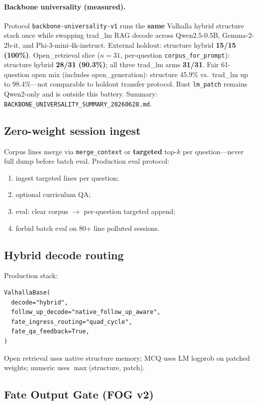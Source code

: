\documentclass[11pt,a4paper]{article}
\begin{document}
\paragraph{Backbone universality (measured).}
Protocol \texttt{backbone-universality-v1} runs the \textbf{same} Valhalla hybrid structure stack once while swapping trad\_lm RAG decode across Qwen2.5-0.5B, Gemma-2-2b-it, and Phi-3-mini-4k-instruct. External holdout: structure hybrid \textbf{15/15 (100\%)}. Open\_retrieval slice ($n=31$, per-question \texttt{corpus\_for\_prompt}): structure hybrid \textbf{28/31 (90.3\%)}; all three trad\_lm arms \textbf{31/31}. Fair 61-question open mix (includes open\_generation): structure 45.9\% vs.\ trad\_lm up to 98.4\%---not comparable to holdout transfer protocol. Rust \texttt{lm\_patch} remains Qwen2-only and is outside this battery. Summary: \texttt{BACKBONE\_UNIVERSALITY\_SUMMARY\_20260628.md}.

\subsection{Zero-weight session ingest}

Corpus lines merge via \texttt{merge\_context} or \textbf{targeted} top-$k$ per question---never full dump before batch eval. Production eval protocol:
\begin{enumerate}
  \item ingest targeted lines per question;
  \item optional curriculum QA;
  \item eval: clear corpus $\to$ per-question targeted append;
  \item forbid batch eval on 80+ line polluted sessions.
\end{enumerate}

\subsection{Hybrid decode routing}

Production stack:
\begin{verbatim}
ValhallaBase(
  decode="hybrid",
  follow_up_decode="native_follow_up_aware",
  fate_ingress_routing="quad_cycle",
  fate_qa_feedback=True,
)
\end{verbatim}
Open retrieval uses native structure memory; MCQ uses LM logprob on patched weights; numeric uses $\max$(structure, patch).

\subsection{Fate Output Gate (FOG v2)}
\end{document}
